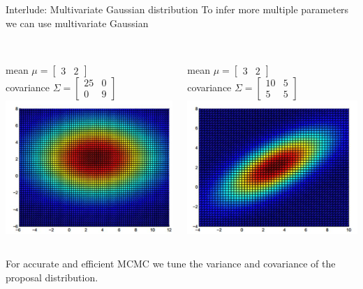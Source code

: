 \documentclass[compress]{beamer}
\begin{document}
\begin{frame}[label=sec-8-2]{Interlude: Multivariate Gaussian distribution}
To infer more multiple parameters we can use multivariate Gaussian\\~\\
\begin{columns}[c] 
mean $\mu = \begin{bmatrix} 3 & 2 \end{bmatrix}$\\
covariance $\Sigma =  \begin{bmatrix} 25 & 0 \\ 0 & 9 \end{bmatrix}$
\includegraphics[width=0.8\linewidth]{MVN1}

mean $\mu = \begin{bmatrix} 3 & 2 \end{bmatrix}$\\
covariance $\Sigma =  \begin{bmatrix} 10 & 5 \\ 5 & 5 \end{bmatrix}$
\includegraphics[width=0.8\linewidth]{MVN2}
\end{columns}  
For accurate and efficient MCMC we tune the variance and covariance of the proposal distribution.
\end{frame}
\end{document}
